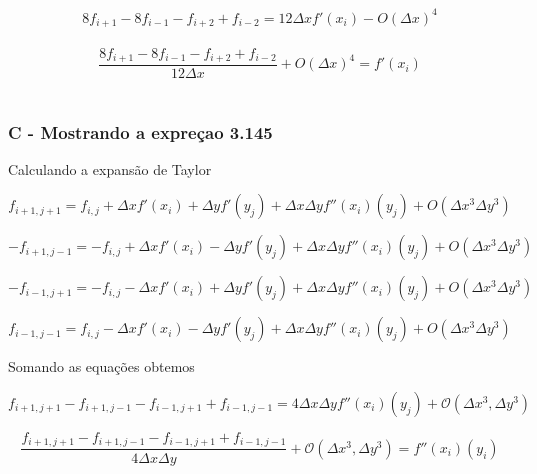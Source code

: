 \documentclass[]{article}
\begin{document}
\begin{equation}
	8f_{i+1} - 8f_{i-1} - f_{i+2} + f_{i-2}  = 12\Delta xf'(x_{i}) - O(\Delta x)^{4}
\end{equation}\\
\begin{equation}
	\frac{8f_{i+1} - 8f_{i-1} - f_{i+2} + f_{i-2}}{12\Delta x} + O(\Delta x)^{4}  = f'(x_{i}) 
\end{equation}\\

\subsubsection*{C - Mostrando a expreçao 3.145}


Calculando a expansão de Taylor

\begin{equation}
f_{i+1, j+1} = f_{i,j} + \Delta x  f'(x_{i}) + \Delta y f'(y_{j}) + \Delta x \Delta y f''(x_{i})(y_{j}) +  O(\Delta x^{3} \Delta y^{3})
\end{equation}

\begin{equation}
	-f_{i+1, j-1} = -f_{i,j} + \Delta x  f'(x_{i}) - \Delta y f'(y_{j}) + \Delta x \Delta y f''(x_{i})(y_{j}) +  O(\Delta x^{3} \Delta y^{3})
\end{equation}

\begin{equation}
	-f_{i-1, j+1} = -f_{i,j} - \Delta x  f'(x_{i}) + \Delta y f'(y_{j}) + \Delta x \Delta y f''(x_{i})(y_{j}) +  O(\Delta x^{3} \Delta y^{3})
\end{equation}

\begin{equation}
	f_{i-1, j-1} = f_{i,j} - \Delta x  f'(x_{i}) - \Delta y f'(y_{j}) + \Delta x \Delta y f''(x_{i})(y_{j}) +  O(\Delta x^{3} \Delta y^{3})
\end{equation}


Somando as equações obtemos 

\begin{equation}
	f_{i+1, j+1} - f_{i+1, j-1} - f_{i-1, j+1} + f_{i-1, j-1} = 4 \Delta x \Delta y f''(x_{i})(y_{j}) + \mathcal{O}(\Delta x^3, \Delta y^3)
\end{equation}

\begin{equation}
	\frac{f_{i+1, j+1} - f_{i+1, j-1} - f_{i-1, j+1} + f_{i-1, j-1}}{4 \Delta x \Delta y} + \mathcal{O}(\Delta x^3, \Delta y^3) =  f''(x_{i})(y_{i})
\end{equation}
\end{document}
